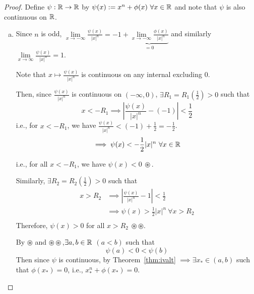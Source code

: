 \begin{proof}
    Define $\psi: \mathbb R \to \mathbb R$ by $\psi(x):= x^n + \phi(x)\ \forall x \in \RR$
    and note that $\psi$ is also continuous on $\mathbb R$.
    \begin{enumerate}[(a)]
        \item Since $n$ is odd, $\lim\limits_{x\to -\infty}\frac{\psi(x)}{|x|^n} = -1 + \underbrace{\lim\limits_{x \to -\infty} \frac{\phi(x)}{|x|^n}}_{=0}$
        and similarly $\lim\limits_{x\to \infty}\frac{\psi(x)}{|x|^n} = 1$.

        Note that $x \mapsto \frac{\psi(x)}{|x|^n}$ is continuous on any internal excluding 0. 

        Then, since $\frac{\psi(x)}{|x|^n}$ is continuous on $(-\infty, 0)$, $\exists R_1 = R_1(\frac{1}{2}) > 0$ such that
        $$x < -R_1 \implies \left|\frac{\psi(x)}{|x|^n} - (-1)\right| < \frac{1}{2}$$
        i.e., for $x < -R_1$, we have $\frac{\psi(x)}{|x|^n} < (-1) + \frac{1}{2} = -\frac{1}{2}$.
        $$\implies \psi(x) < -\frac{1}{2}|x|^n\ \forall x \in \RR$$

        i.e., for all $x < -R_1$, we have $\psi(x) < 0\ \circledast$.

        Similarly, $\exists R_2 = R_2(\frac{1}{2}) > 0$ such that 
        \begin{align*}
            x > R_2 &\implies \left|\frac{\psi(x)}{|x|^n}  - 1\right| < \frac{1}{2} \\
            &\implies \psi(x) >\frac{1}{2} |x|^n\ \forall x > R_2 \\
        \end{align*}
        Therefore, $\psi(x) > 0$ for all $x > R_2\ \circledast \circledast $.

        By $\circledast$ and $\circledast \circledast$,$\exists a, b \in \mathbb R$ $(a < b)$ such that
        $$\psi(a) < 0 < \psi(b)$$ Then since $\psi$ is continuous, by Theorem~\ref{thm:ivalt}
        $\implies \exists x_* \in (a, b)$ such that $\phi(x_*) = 0$, i.e., $x_*^n + \phi(x_*) = 0$.
    \end{enumerate}
\end{proof}

\begin{example}
    
\end{example}
\begin{example}
    
\end{example}
\begin{example}
    
\end{example}


